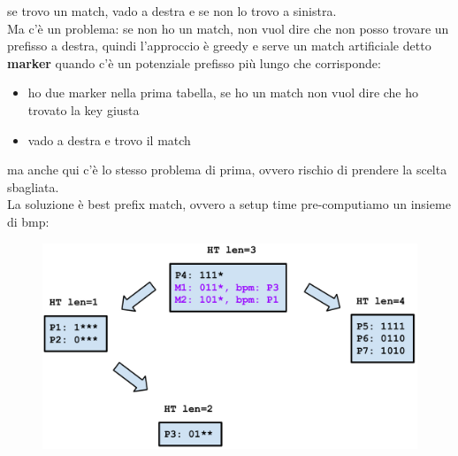 \documentclass[12pt, oneside]{extbook} %
\begin{document}
se trovo un match, vado a destra e se non lo trovo a sinistra.
\\Ma c'è un problema: se non ho un match, non vuol dire che non posso trovare un prefisso a destra, quindi l'approccio è greedy e serve un match artificiale detto \textbf{marker} quando c'è un potenziale prefisso più lungo che corrisponde:
\begin{itemize}
\item ho due marker nella prima tabella, se ho un match non vuol dire che ho trovato la key giusta
\item vado a destra e trovo il match
\end{itemize}
ma anche qui c'è lo stesso problema di prima, ovvero rischio di prendere la scelta sbagliata.
\\La soluzione è best prefix match, ovvero a setup time pre-computiamo un insieme di bmp:\\
\begin{figure}[h!]
    \centering
    \includegraphics[scale=0.5]{../../immagini/bpf}
\end{figure}
\end{document}
